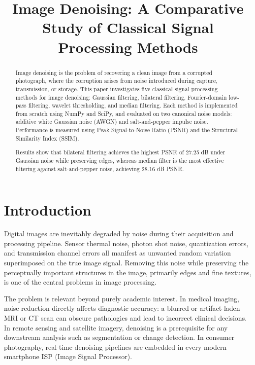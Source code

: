 \documentclass[conference]{IEEEtran}
\title{Image Denoising: A Comparative Study of Classical Signal Processing Methods}
\author{
  \IEEEauthorblockN{[Alexandru-Ionuț Țîncu]}
  \IEEEauthorblockA{
    Facultatea de Matematică și Informatică \\
    Universitatea din București \\
    București, România \\
  }
}
\begin{document}
\maketitle

\begin{abstract}
Image denoising is the problem of recovering a clean image from a corrupted photograph, where the corruption arises from noise introduced during capture, transmission, or storage. This paper investigates five classical signal processing methods for image denoising: Gaussian filtering, bilateral filtering, Fourier-domain low-pass filtering, wavelet thresholding, and median filtering. Each method is implemented from scratch using NumPy and SciPy, and evaluated on two canonical noise models: additive white Gaussian noise (AWGN)
and salt-and-pepper impulse noise. Performance is measured using Peak Signal-to-Noise Ratio (PSNR) and the Structural Similarity Index (SSIM).

Results show that bilateral filtering achieves the highest PSNR of 27.25 dB under Gaussian noise while preserving edges, whereas median filter is the most effective filtering against salt-and-pepper noise, achieving 28.16 dB PSNR.
\end{abstract}

\section{Introduction}

Digital images are inevitably degraded by noise during their acquisition and processing pipeline. Sensor thermal noise, photon shot noise, quantization errors, and transmission channel errors all manifest as unwanted random variation superimposed on the true image signal. Removing this noise while preserving the perceptually important structures in the image, primarily edges and fine textures, is one of the central problems in image processing.

The problem is relevant beyond purely academic interest. In medical imaging, noise reduction directly affects diagnostic accuracy: a blurred or artifact-laden MRI or CT scan can obscure pathologies and lead to incorrect clinical decisions. In remote sensing and satellite imagery, denoising is a prerequisite for any downstream analysis such as segmentation or change detection. In consumer photography, real-time denoising pipelines are embedded in every modern smartphone ISP (Image Signal Processor).
\end{document}
